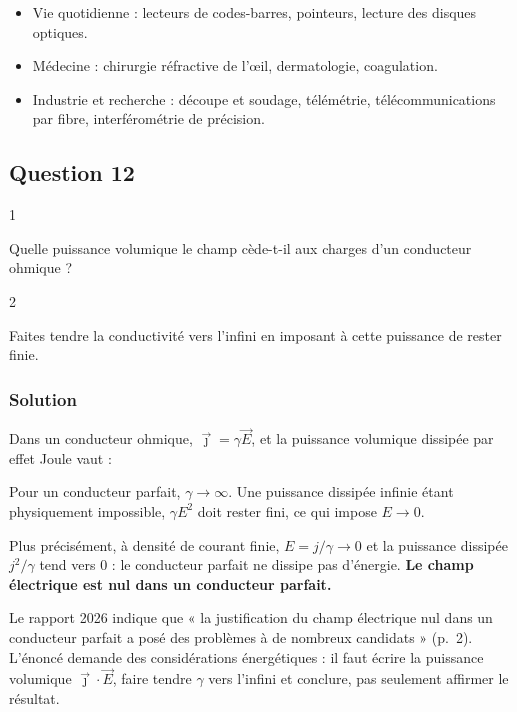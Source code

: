 \documentclass[11pt,a4paper]{article}
\providecommand{\tightlist}{\setlength{\itemsep}{0pt}\setlength{\parskip}{0pt}}
\newcommand{\equationajustee}[1]{%
  \sbox{\boiteequation}{$\displaystyle #1$}%
  \ifdim\wd\boiteequation>\linewidth
    \[\resizebox{\linewidth}{!}{\usebox{\boiteequation}}\]%
  \else
    \[#1\]%
  \fi}
\begin{document}
\begin{itemize}
\tightlist
\item
  Vie quotidienne : lecteurs de codes-barres, pointeurs, lecture des disques optiques.
\item
  Médecine : chirurgie réfractive de l'œil, dermatologie, coagulation.
\item
  Industrie et recherche : découpe et soudage, télémétrie, télécommunications par fibre, interférométrie de précision.
\end{itemize}

\hypertarget{question-12}{%
\subsection{Question 12}\label{question-12}}

\begin{indication}{1}

Quelle puissance volumique le champ cède-t-il aux charges d'un conducteur ohmique ?

\end{indication}

\begin{indication}{2}

Faites tendre la conductivité vers l'infini en imposant à cette puissance de rester finie.

\end{indication}

\hypertarget{solution-11}{%
\subsubsection{Solution}\label{solution-11}}

Dans un conducteur ohmique, \(\vec\jmath=\gamma\vec E\), et la puissance volumique dissipée par effet Joule vaut :

\equationajustee{p=\vec\jmath\cdot\vec E=\gamma E^2}

Pour un conducteur parfait, \(\gamma\to\infty\). Une puissance dissipée infinie étant physiquement impossible, \(\gamma E^2\) doit rester fini, ce qui impose \(E\to0\).

Plus précisément, à densité de courant finie, \(E=j/\gamma\to0\) et la puissance dissipée \(j^2/\gamma\) tend vers 0 : le conducteur parfait ne dissipe pas d'énergie. \textbf{Le champ électrique est nul dans un conducteur parfait.}

\begin{jury}

Le rapport 2026 indique que « la justification du champ électrique nul dans un conducteur parfait a posé des problèmes à de nombreux candidats » (p.~2). L'énoncé demande des considérations énergétiques : il faut écrire la puissance volumique \(\vec\jmath\cdot\vec E\), faire tendre \(\gamma\) vers l'infini et conclure, pas seulement affirmer le résultat.

\end{jury}
\end{document}
